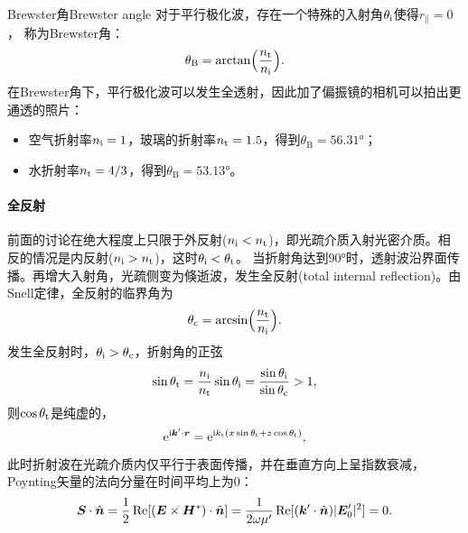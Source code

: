 \begin{example}
    {Brewster角}{Brewster angle}
    对于平行极化波，存在一个特殊的入射角$\theta_\mathrm i$使得$r_\parallel = 0$，%
    称为Brewster角：
    \begin{equation}
        \label{eqn:Brewster}
        \theta_{\mathrm{B}} = \arctan\Bigl(\frac{n_\mathrm t}{n_\mathrm i}\Bigr).
    \end{equation}
    在Brewster角下，平行极化波可以发生全透射，因此加了偏振镜的相机可以拍出更通透的照片：
    \begin{itemize}
        \item 空气折射率$n_\mathrm i = 1$，玻璃的折射率$n_\mathrm t = 1.5$，得到$\theta_{\mathrm{B}} = \ang{56.31}$；
        \item 水折射率$n_\mathrm t = 4/3$，得到$\theta_{\mathrm{B}} = \ang{53.13}$。
    \end{itemize}
    
\end{example}

\paragraph{全反射}

前面的讨论在绝大程度上只限于外反射($n_\mathrm i < n_\mathrm t$)，即光疏介质入射光密介质。相反的情况是内反射($n_\mathrm i > n_\mathrm t$)，这时$\theta_\mathrm i < \theta_\mathrm t$。
当折射角达到$\ang{90}$时，透射波沿界面传播。再增大入射角，光疏侧变为倏逝波，发生全反射(total internal reflection)。由Snell定律，全反射的临界角为
\begin{equation}
    \label{eqn:total reflect}
    \theta_\mathrm c = \arcsin\Bigl(\frac{n_\mathrm t}{n_\mathrm i}\Bigr).
\end{equation}
发生全反射时，$\theta_\mathrm i > \theta_\mathrm c$，折射角的正弦
\[
    \sin\theta_\mathrm t = \frac{n_\mathrm i}{n_\mathrm t}\sin\theta_\mathrm i = \frac{\sin\theta_\mathrm i}{\sin\theta_\mathrm c} > 1,
\]
则$\cos\theta_\mathrm t$是纯虚的，
\[
    \mathop{}\!\mathrm{e}^{\mathrm{i}\bm k'\cdot\bm r} = \mathop{}\!\mathrm{e}^{\mathrm{i} k_\mathrm t(x\sin\theta_\mathrm t+z\cos\theta_\mathrm t)},
\]
此时折射波在光疏介质内仅平行于表面传播，并在垂直方向上呈指数衰减，Poynting矢量的法向分量在时间平均上为0：
\[
    \bm S \cdot \mathop{}\!\hat{\bm{n}} = \frac12\operatorname{Re}[(\bm E \times \bm H^\ast) \cdot \mathop{}\!\hat{\bm{n}}] = \frac1{2\omega\mu'}\operatorname{Re}[(\bm k' \cdot \mathop{}\!\hat{\bm{n}})\lvert\bm E'_0\rvert^2] = 0.
\]


